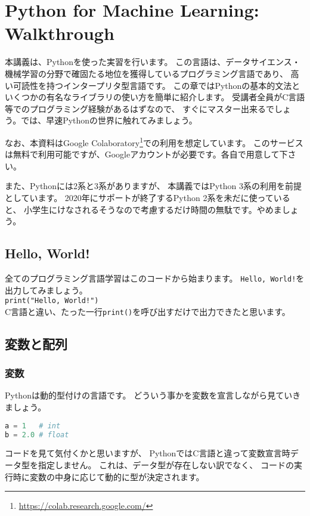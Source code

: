 \chapter{Python for Machine Learning: Walkthrough}
	本講義は、Pythonを使った実習を行います。
	この言語は、データサイエンス・機械学習の分野で確固たる地位を獲得しているプログラミング言語であり、
	高い可読性を持つインタープリタ型言語です。
	この章ではPythonの基本的文法と
	いくつかの有名なライブラリの使い方を簡単に紹介します。
	受講者全員がC言語等でのプログラミング経験があるはずなので、
	すぐにマスター出来るでしょう。では、早速Pythonの世界に触れてみましょう。

	なお、本資料はGoogle Colaboratory\footnote[1]{\url{https://colab.research.google.com/}}での利用を想定しています。
	このサービスは無料で利用可能ですが、Googleアカウントが必要です。各自で用意して下さい。
	
	また、Pythonには2系と3系がありますが、
	本講義ではPython 3系の利用を前提としています。
	2020年にサポートが終了するPython 2系を未だに使っていると、
	小学生にけなされる\cite{python_rl}そうなので考慮するだけ時間の無駄です。やめましょう。
	
	\section{Hello, World!}	
		全てのプログラミング言語学習はこのコードから始まります。
		\texttt{Hello, World!}を出力してみましょう。 \\
		
		\texttt{print("Hello, World!")} \\
		
		C言語と違い、たった一行\texttt{print()}を呼び出すだけで出力できたと思います。
	
	\section{変数と配列}
		\subsection{変数}
			Pythonは動的型付けの言語です。
			どういう事かを変数を宣言しながら見ていきましょう。
	\begin{lstlisting}[basicstyle=\ttfamily, language=python, tabsize=4, frame=single]
a = 1	# int
b = 2.0	# float
	\end{lstlisting}
		
			コードを見て気付くかと思いますが、
			PythonではC言語と違って変数宣言時データ型を指定しません。
			これは、データ型が存在しない訳でなく、
			コードの実行時に変数の中身に応じて動的に型が決定されます。
			
